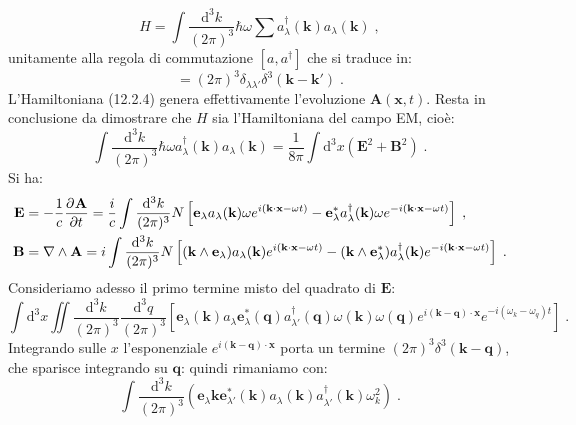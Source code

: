 \documentclass[10pt,a4paper]{report}
\theoremstyle{definition}
\newcommand{\pdev}[3][]{\frac{\partial^{#1} #2}{\partial #3^{#1}}}
\numberwithin{equation}{section}
\newcommand{\diff}[1][]{\mathrm{d}#1}
\newcommand{\adj}[1]{#1^{\dagger}}
\begin{document}
\begin{equation}
H=\int \frac{\diff^3{k}}{(2\pi)^3}\hbar\omega\sum \adj{a_{\lambda}}(\mathbf{k})a_{\lambda}(\mathbf{k})\;,
\end{equation}
unitamente alla regola di commutazione $[a,\adj{a}]$ che si traduce in:
\begin{equation}
[a_{\lambda}(\mathbf{k}),\adj{a}_{\lambda'}(\mathbf{k}')]=(2\pi)^3\delta_{\lambda\lambda'}\delta^3(\mathbf{k}-\mathbf{k}')\;.
\end{equation}
L'Hamiltoniana (12.2.4) genera effettivamente l'evoluzione $\mathbf{A}(\mathbf{x},t)$. Resta in conclusione da dimostrare che $H$ sia l'Hamiltoniana del campo EM, cioè:
\begin{equation}
\int \frac{\diff^3{k}}{(2\pi)^3}\hbar\omega\adj{a_{\lambda}}(\mathbf{k})a_{\lambda}(\mathbf{k})=\frac{1}{8\pi}\int\diff^3{x}(\mathbf{E}^2+\mathbf{B}^2)\;.
\end{equation}
Si ha:
\begin{align}
\mathbf{E} &= -\frac{1}{c}\pdev{\mathbf{A}}{t} = \frac{i}{c}\int\frac{\diff^3{k}}{(2\pi)^3}N\left[
\mathbf{e}_{\lambda}a_{\lambda}(\mathbf{k})\omega e^{i(\mathbf{k}\cdot\mathbf{x}-\omega t)}-
\mathbf{e}_{\lambda}^* \adj{a_{\lambda}}(\mathbf{k})\omega e^{-i(\mathbf{k}\cdot\mathbf{x}-\omega t)}\right] \notag\;, \\
\mathbf{B} &= \nabla\wedge\mathbf{A}=i\int\frac{\diff^3{k}}{(2\pi)^3}N\left[(\mathbf{k}\wedge\mathbf{e}_{\lambda})a_{\lambda}(\mathbf{k})e^{i(\mathbf{k}\cdot\mathbf{x}-\omega t)}-
(\mathbf{k}\wedge\mathbf{e}_{\lambda}^*)\adj{a_{\lambda}}(\mathbf{k})e^{-i(\mathbf{k}\cdot\mathbf{x}-\omega t)}\right]\;.
\end{align}
Consideriamo adesso il primo termine misto del quadrato di $\mathbf{E}$:
\begin{equation}
\int\diff^3{x}\iint \frac{\diff^3{k}}{(2\pi)^3}\frac{\diff^3{q}}{(2\pi)^3}\left[
\mathbf{e}_{\lambda}(\mathbf{k})a_{\lambda}\mathbf{e}_{\lambda}^*(\mathbf{q})\adj{a_{\lambda'}}(\mathbf{q})\omega(\mathbf{k})\omega(\mathbf{q})e^{i(\mathbf{k}-\mathbf{q})\cdot\mathbf{x}}e^{-i(\omega_k-\omega_q)t}\right]\;.
\end{equation}
Integrando sulle $x$ l'esponenziale $e^{i(\mathbf{k}-\mathbf{q})\cdot\mathbf{x}}$ porta un termine $(2\pi)^3\delta^3(\mathbf{k}-\mathbf{q})$, che sparisce integrando su $\mathbf{q}$: quindi rimaniamo con:
\begin{equation}
\int\frac{\diff^3{k}}{(2\pi)^3}\left(\mathbf{e}_{\lambda}\mathbf{k}\mathbf{e}_{\lambda'}^*(\mathbf{k})a_{\lambda}(\mathbf{k})\adj{a_{\lambda'}}(\mathbf{k})\omega_k^2\right)\;.
\end{equation}
\end{document}
